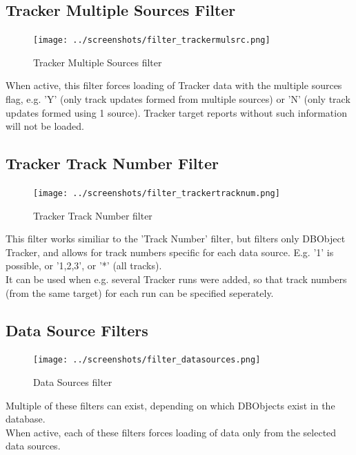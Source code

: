 \subsection{Tracker Multiple Sources Filter}

\begin{figure}[H]
  \center
    \texttt{[image: ../screenshots/filter\_trackermulsrc.png]}
  \caption{Tracker Multiple Sources filter}
\end{figure}

When active, this filter forces loading of Tracker data with the multiple sources flag, e.g. 'Y' (only track updates formed from multiple sources) or 'N' (only track updates formed using 1 source). Tracker target reports without such information will not be loaded.

\subsection{Tracker Track Number Filter}

\begin{figure}[H]
  \center
    \texttt{[image: ../screenshots/filter\_trackertracknum.png]}
  \caption{Tracker Track Number filter}
\end{figure}

This filter works similiar to the 'Track Number' filter, but filters only DBObject Tracker, and allows for track numbers specific for each data source. E.g. '1' is possible, or '1,2,3', or '*' (all tracks).\\

It can be used when e.g. several Tracker runs were added, so that track numbers (from the same target) for each run can be specified seperately. \\

\subsection{Data Source Filters}

\begin{figure}[H]
  \center
    \texttt{[image: ../screenshots/filter\_datasources.png]}
  \caption{Data Sources filter}
\end{figure}

Multiple of these filters can exist, depending on which DBObjects exist in the database. \\

When active, each of these filters forces loading of data only from the selected data sources. \\


